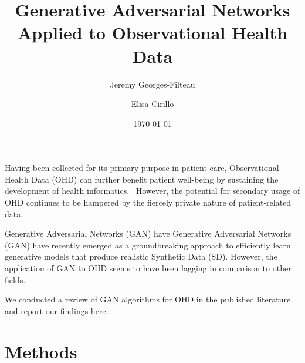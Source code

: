 \documentclass[10pt]{article}
\renewenvironment{abstract}
  {{\bfseries\noindent{\abstractname}\par\nobreak}\footnotesize}
  {\bigskip}
\begin{document}
\title{Generative Adversarial Networks Applied to Observational Health Data}



\author[1,2]{Jeremy Georges-Filteau}%
\author[2]{Elisa Cirillo}%
%
%


\vspace{-1em}



  \date{\today}


\begingroup
\let\center\flushleft
\let\endcenter\endflushleft
\maketitle
\endgroup





\begin{abstract}
Having been collected for its primary purpose in patient care,
Observational Health Data (OHD) can further benefit patient well-being
by sustaining the development of health informatics.~ However, the
potential for secondary usage of OHD continues to be hampered by the
fiercely private nature of patient-related data. ~

Generative Adversarial Networks (GAN) have Generative Adversarial
Networks (GAN) have recently emerged as a groundbreaking approach to
efficiently learn generative models that produce realistic Synthetic
Data (SD). However, the application of GAN to OHD seems to have been
lagging in comparison to other fields.

We conducted a review of GAN algorithms for OHD in the published
literature, and report our findings here.%
\end{abstract}%



\sloppy










\section{Methods}
\end{document}
